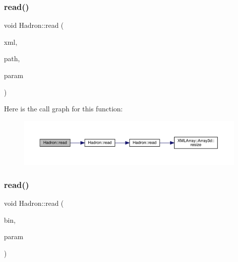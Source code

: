 \subsubsection{\texorpdfstring{read()}{read()}\hspace{0.1cm}{\footnotesize\ttfamily [12/94]}}
{\footnotesize\ttfamily void Hadron\+::read (\begin{DoxyParamCaption}\item[{\mbox{\hyperlink{classADATXML_1_1XMLReader}{X\+M\+L\+Reader}} \&}]{xml,  }\item[{const std\+::string \&}]{path,  }\item[{\mbox{\hyperlink{structHadron_1_1KeyHadronSUNNPartNPtCorr__t_1_1NPoint__t}{Key\+Hadron\+S\+U\+N\+N\+Part\+N\+Pt\+Corr\+\_\+t\+::\+N\+Point\+\_\+t}} \&}]{param }\end{DoxyParamCaption})}

Here is the call graph for this function\+:
\nopagebreak
\begin{figure}[H]
\begin{center}
\leavevmode
\includegraphics[width=350pt]{d1/daf/namespaceHadron_aaef0a2bed7d8dd73e0611d46f68b4ee6_cgraph}
\end{center}
\end{figure}
\mbox{\label{namespaceHadron_ad89b4230ad913b777ca725473df40d15}} 
\subsubsection{\texorpdfstring{read()}{read()}\hspace{0.1cm}{\footnotesize\ttfamily [13/94]}}
{\footnotesize\ttfamily void Hadron\+::read (\begin{DoxyParamCaption}\item[{\mbox{\hyperlink{classADATIO_1_1BinaryReader}{Binary\+Reader}} \&}]{bin,  }\item[{\mbox{\hyperlink{structHadron_1_1KeyCGCSU3__t}{Key\+C\+G\+C\+S\+U3\+\_\+t}} \&}]{param }\end{DoxyParamCaption})}



